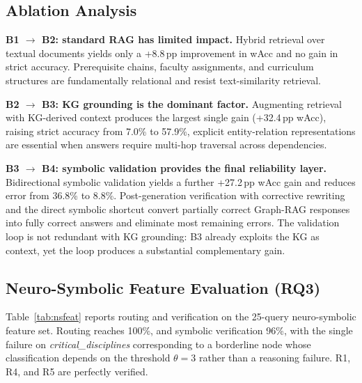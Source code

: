 \documentclass[12pt]{article}
\begin{document}
\subsection{Ablation Analysis}

\noindent\textbf{B1 $\rightarrow$ B2: standard RAG has limited impact.} Hybrid retrieval over textual documents yields only a +8.8\,pp improvement in wAcc and no gain in strict accuracy. Prerequisite chains, faculty assignments, and curriculum structures are fundamentally relational and resist text-similarity retrieval.

\noindent\textbf{B2 $\rightarrow$ B3: KG grounding is the dominant factor.} Augmenting retrieval with KG-derived context produces the largest single gain (+32.4\,pp wAcc), raising strict accuracy from 7.0\% to 57.9\%, explicit entity-relation representations are essential when answers require multi-hop traversal across dependencies.

\noindent\textbf{B3 $\rightarrow$ B4: symbolic validation provides the final reliability layer.} Bidirectional symbolic validation yields a further +27.2\,pp wAcc gain and reduces error from 36.8\% to 8.8\%. Post-generation verification with corrective rewriting and the direct symbolic shortcut convert partially correct Graph-RAG responses into fully correct answers and eliminate most remaining errors. The validation loop is not redundant with KG grounding: B3 already exploits the KG as context, yet the loop produces a substantial complementary gain.

\subsection{Neuro-Symbolic Feature Evaluation (RQ3)}

Table~\ref{tab:nsfeat} reports routing and verification on the 25-query neuro-symbolic feature set. Routing reaches 100\%, and symbolic verification 96\%, with the single failure on \textit{critical\_disciplines} corresponding to a borderline node whose classification depends on the threshold $\theta=3$ rather than a reasoning failure. R1, R4, and R5 are perfectly verified.
\end{document}
